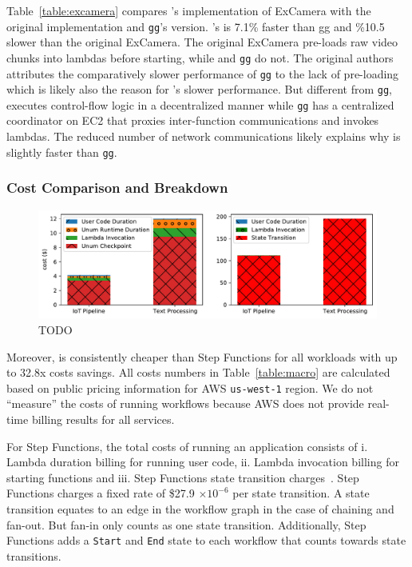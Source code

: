 Table~\ref{table:excamera} compares \name{}'s implementation of ExCamera with
the original implementation and \texttt{gg}'s version. \name{}'s is 7.1\%
faster than gg and \%10.5 slower than the original ExCamera. The original
ExCamera pre-loads raw video chunks into lambdas before starting, while
\name{} and \texttt{gg} do not. The original authors attributes the
comparatively slower performance of \texttt{gg} to the lack of pre-loading
which is likely also the reason for \name{}'s slower performance. But
different from \texttt{gg}, \name{} executes control-flow logic in a
decentralized manner while \texttt{gg} has a centralized coordinator on EC2
that proxies inter-function communications and invokes lambdas. The reduced
number of network communications likely explains why \name{} is slightly
faster than \texttt{gg}.

\subsubsection{Cost Comparison and Breakdown}

\begin{figure}[t!]
    \centering
    \includegraphics[width=\columnwidth]{figures/AppCostBreakdown.pdf}
    \caption{TODO}
    \label{fig:cost-breakdown}
\end{figure}

Moreover, \name{} is consistently cheaper than Step Functions for all
workloads with up to 32.8x costs savings. All costs numbers in
Table~\ref{table:macro} are calculated based on public pricing information for
AWS \texttt{us-west-1} region. We do not ``measure'' the costs of running
workflows because AWS does not provide real-time billing results for all
services.

For Step Functions, the total costs of running an application consists of i.
Lambda duration billing for running user code, ii. Lambda invocation billing
for starting functions and iii. Step Functions state transition
charges~\cite{aws-step-functions-pricing}. Step Functions charges a fixed rate
of \$27.9 $ \times 10^{-6}$ per state transition. A state transition equates
to an edge in the workflow graph in the case of chaining and fan-out. But
fan-in only counts as one state transition. Additionally, Step Functions adds
a \texttt{Start} and \texttt{End} state to each workflow that counts towards
state transitions.

